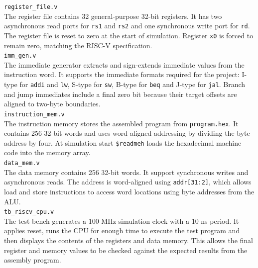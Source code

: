 \documentclass[12pt,a4paper]{article}
\begin{document}
\bigskip
\texttt{register\_file.v}\\
The register file contains 32 general-purpose 32-bit registers. It has two asynchronous read ports for \texttt{rs1} and \texttt{rs2} and one synchronous write port for \texttt{rd}. The register file is reset to zero at the start of simulation. Register \texttt{x0} is forced to remain zero, matching the RISC-V specification.\\
\bigskip
\texttt{imm\_gen.v}\\
The immediate generator extracts and sign-extends immediate values from the instruction word. It supports the immediate formats required for the project: I-type for \texttt{addi} and \texttt{lw}, S-type for \texttt{sw}, B-type for \texttt{beq} and J-type for \texttt{jal}. Branch and jump immediates include a final zero bit because their target offsets are aligned to two-byte boundaries.\\
\bigskip
\texttt{instruction\_mem.v}\\
The instruction memory stores the assembled program from \texttt{program.hex}. It contains 256 32-bit words and uses word-aligned addressing by dividing the byte address by four. At simulation start \texttt{\$readmeh} loads the hexadecimal machine code into the memory array.\\
\bigskip
\texttt{data\_mem.v}\\
The data memory contains 256 32-bit words. It support synchronous writes and asynchronous reads. The address is word-aligned using \texttt{addr[31:2]}, which allows load and store instructions to access word locations using byte addresses from the ALU.\\
\bigskip
\texttt{tb\_riscv\_cpu.v}\\
The test bench generates a 100 MHz simulation clock with a 10 ns period. It applies reset, runs the CPU for enough time to execute the test program and then displays the contents of the registers and data memory. This allows the final register and memory values to be checked against the expected results from the assembly program.
\end{document}
